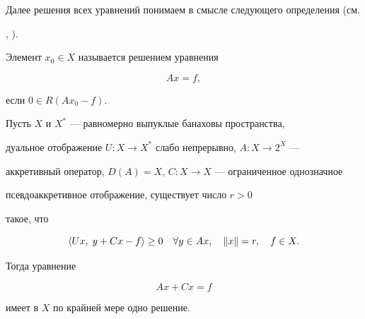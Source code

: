  


Далее решения всех уравнений понимаем в смысле следующего определения (см. 


\cite{Ab}, \cite{Rya1}). 


 


\begin{defn} Элемент $x_0\in X$ называется решением уравнения 


\begin{equation} 


Ax=f, 


\end{equation} 


если $0\in R(Ax_0-f)$. 


\end{defn} 


 


\begin{thm} Пусть $X$ и $X^*$ --- равномерно выпуклые банаховы пространства, 


дуальное отображение $U:X\to X^*$ слабо непрерывно, $A:X\to 2^X$ --- 


аккретивный оператор, $D(A)=X$, $C:X\to X$ --- ограниченное однозначное 


псевдоаккретивное отображение, существует число $r>0$ 


такое, что 


\begin{equation} 


\la Ux,\;y+Cx-f\ra \ge 0\quad\forall y\in Ax,\quad\|x\|=r,\quad f\in X. 


\end{equation} 


Тогда уравнение 


\begin{equation} 


Ax+Cx=f 


\end{equation} 


имеет в $X$ по крайней мере одно решение. 


\end{thm} 


 


